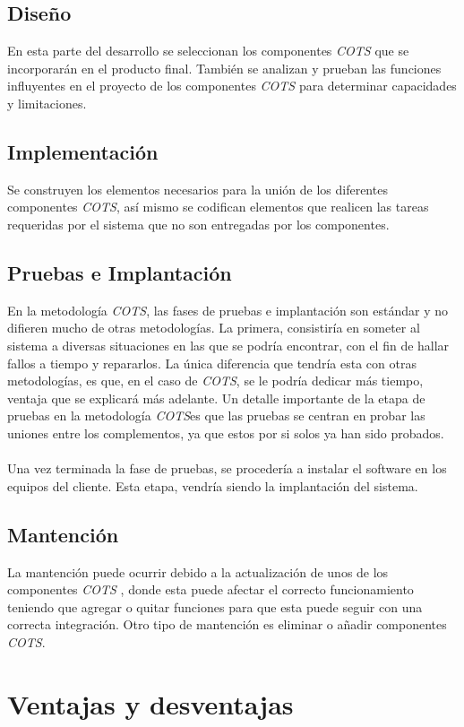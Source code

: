 \documentclass{udpreport}
\begin{document}
	\section{Diseño}
	    En esta parte del desarrollo se seleccionan los componentes \emph{COTS} que se incorporarán en el producto final. También se analizan y prueban las funciones influyentes en el proyecto de los componentes \emph{COTS} para determinar capacidades y limitaciones. 
	
	\section{Implementación}
	    Se construyen los elementos necesarios para la unión de los diferentes componentes \emph{COTS}, así mismo se codifican elementos que realicen las tareas requeridas por el sistema que no son entregadas por los componentes.
	    
	\section{Pruebas e Implantación}
	   En la metodología \emph{COTS}, las fases de pruebas e implantación son estándar y no difieren mucho de otras metodologías. La primera, consistiría en someter al sistema a diversas situaciones en las que se podría encontrar, con el fin de hallar fallos a tiempo y repararlos. La única diferencia que tendría esta con otras metodologías, es que, en el caso de \emph{COTS}, se le podría dedicar más tiempo, ventaja que se explicará más adelante. Un detalle importante de la etapa de pruebas en la metodología \emph{COTS}es que las pruebas se centran en probar las uniones entre los complementos, ya que estos por si solos ya han sido probados.\\\\
	   Una vez terminada la fase de pruebas, se procedería a instalar el software en los equipos del cliente. Esta etapa, vendría siendo la implantación del sistema.
	\section{Mantención}
	   La mantención puede ocurrir debido a la actualización de unos de los componentes \emph{COTS} , donde esta puede afectar el correcto funcionamiento teniendo que agregar o quitar funciones para que esta puede seguir con una correcta integración. Otro tipo de mantención es eliminar o añadir componentes \emph{COTS}.
	
\chapter{Ventajas y desventajas}
\end{document}
